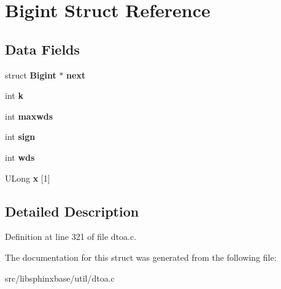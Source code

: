\section{Bigint Struct Reference}
\label{structBigint}
\subsection*{Data Fields}
\begin{DoxyCompactItemize}
\item 
struct {\bf Bigint} $\ast$ {\bfseries next}\label{structBigint_a3a1296e26ef617e775d5e366e390e7fc}

\item 
int {\bfseries k}\label{structBigint_a032d76e80da2f21df10c0794244d12f2}

\item 
int {\bfseries maxwds}\label{structBigint_a5ffcac6f95ded3bc1fc23204f46f10d0}

\item 
int {\bfseries sign}\label{structBigint_a4380eb98f7653bb74d8377c0d68d6cb7}

\item 
int {\bfseries wds}\label{structBigint_aa737992ebddb9d6a7e2d23bfecdb080e}

\item 
U\+Long {\bfseries x} [1]\label{structBigint_ae56981315f471a190603887aee98ca99}

\end{DoxyCompactItemize}


\subsection{Detailed Description}


Definition at line 321 of file dtoa.\+c.



The documentation for this struct was generated from the following file\+:\begin{DoxyCompactItemize}
\item 
src/libsphinxbase/util/dtoa.\+c\end{DoxyCompactItemize}
